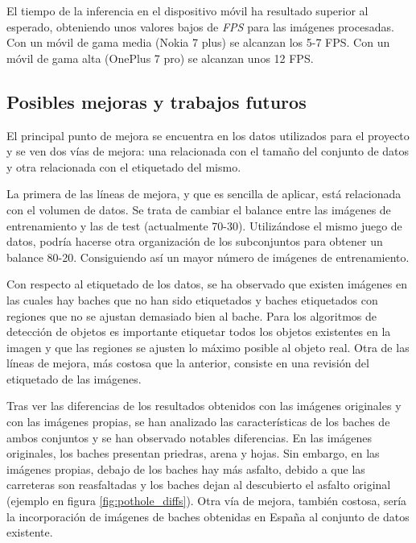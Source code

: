 El tiempo de la inferencia en el dispositivo móvil ha resultado superior al esperado, obteniendo unos valores bajos de \textit{FPS} para las imágenes procesadas. Con un móvil de gama media (Nokia 7 plus) se alcanzan los 5-7 FPS. Con un móvil de gama alta (OnePlus 7 pro) se alcanzan unos 12 FPS.

\subsection{Posibles mejoras y trabajos futuros}

El principal punto de mejora se encuentra en los datos utilizados para el proyecto y se ven dos vías de mejora: una relacionada con el tamaño del conjunto de datos y otra relacionada con el etiquetado del mismo.

La primera de las líneas de mejora, y que es sencilla de aplicar, está relacionada con el volumen de datos. Se trata de cambiar el balance entre las imágenes de entrenamiento y las de test (actualmente 70-30). Utilizándose el mismo juego de datos, podría hacerse otra organización de los subconjuntos para obtener un balance 80-20. Consiguiendo así un mayor número de imágenes de entrenamiento.

Con respecto al etiquetado de los datos, se ha observado que existen imágenes en las cuales hay baches que no han sido etiquetados y baches etiquetados con regiones que no se ajustan demasiado bien al bache. Para los algoritmos de detección de objetos es importante etiquetar todos los objetos existentes en la imagen y que las regiones se ajusten lo máximo posible al objeto real. Otra de las líneas de mejora, más costosa que la anterior, consiste en una revisión del etiquetado de las imágenes.

Tras ver las diferencias de los resultados obtenidos con las imágenes originales y con las imágenes propias, se han analizado las características de los baches de ambos conjuntos y se han observado notables diferencias. En las imágenes originales, los baches presentan priedras, arena y hojas. Sin embargo, en las imágenes propias, debajo de los baches hay más asfalto, debido a que las carreteras son reasfaltadas y los baches dejan al descubierto el asfalto original (ejemplo en figura \ref{fig:pothole_diffs}). Otra vía de mejora, también costosa, sería la incorporación de imágenes de baches obtenidas en España al conjunto de datos existente.

